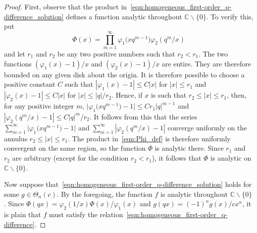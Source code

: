\documentclass[10pt,a4paper]{amsart}
\numberwithin{equation}{section}
\newcommand{\C}{\mathbb{C}}
\begin{document}
\begin{proof}
First, observe that the product in~\eqref{eqn:homogeneous_first-order_q-difference_solution} defines a function analytic throughout $\C\backslash\{0\}$. To verify this, put
\begin{equation} \label{eqn:Phi_def}
\Phi(x) = \prod_{m=1}^\infty \varphi_1\bigl(xq^{m-1}\bigr) \varphi_2(q^m/x)
\end{equation}
and let $r_1$ and $r_2$ be any two positive numbers such that $r_2 < r_1$. The two functions $(\varphi_1(x)-1)/x$ and $(\varphi_2(x)-1)/x$ are entire. They are therefore bounded on any given disk about the origin. It is therefore possible to choose a positive constant $C$ such that $|\varphi_1(x)-1| \leq C|x|$ for $|x| \leq r_1$ and $|\varphi_2(x)-1| \leq C|x|$ for $|x| \leq |q|/r_2$. Hence, if $x$ is such that $r_2 \leq |x| \leq r_1$, then, for any positive integer $m$,
$\big| \varphi_1\bigl(xq^{m-1}\bigr) - 1 \big| \leq Cr_1|q|^{m-1}$ and $|\varphi_2(q^m/x) - 1| \leq C|q|^m/r_2$.
It follows from this that the series $\sum_{m=1}^\infty \big|\varphi_1\bigl(xq^{m-1}\bigr) - 1\big|$ and $\sum_{m=1}^\infty |\varphi_2(q^m/x) - 1|$ converge uniformly on the annulus $r_2 \leq |x| \leq r_1$. The product in~\eqref{eqn:Phi_def} is therefore uniformly convergent on the same region, so the function $\Phi$ is analytic there. Since $r_1$ and $r_2$ are arbitrary (except for the condition $r_2<r_1$), it follows that $\Phi$ is analytic on $\C\backslash\{0\}$.

Now suppose that~\eqref{eqn:homogeneous_first-order_q-difference_solution} holds for some $g \in \Theta_n(c)$. By the foregoing, the function $f$ is analytic throughout $\C\backslash\{0\}$. Since $\Phi(qx) = \varphi_2(1/x) \Phi(x) / \varphi_1(x)$ and $g(qx) = (-1)^n g(x)/cx^n$, it is plain that $f$ must satisfy the relation~\eqref{eqn:homogeneous_first-order_q-difference}.


\end{proof}
\end{document}
